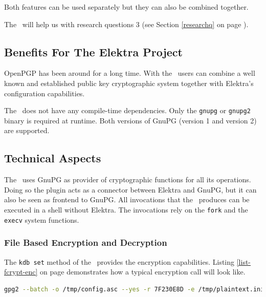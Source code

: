 Both features can be used separately but they can also be combined together.

The \fcrypt ~will help us with research questions 3 (see Section \ref{researchq} on page \pageref{researchq}).

\subsection{Benefits For The Elektra Project}

OpenPGP has been around for a long time.
With the \fcrypt ~users can combine a well known and established public key cryptographic system together with Elektra's configuration capabilities.

The \fcrypt ~does not have any compile-time dependencies.
Only the \texttt{gnupg} or \texttt{gnupg2} binary is required at runtime.
Both versions of GnuPG (version 1 and version 2) are supported.

%

\subsection{Technical Aspects}

The \fcrypt ~uses GnuPG as provider of cryptographic functions for all its operations.
Doing so the plugin acts as a connector between Elektra and GnuPG, but it can also be seen as frontend to GnuPG.
All invocations that the \fcrypt ~produces can be executed in a shell without Elektra.
The invocations rely on the \texttt{fork} and the \texttt{execv} system functions.

\subsubsection{File Based Encryption and Decryption}

The \texttt{kdb set} method of the \fcrypt ~provides the encryption capabilities.
Listing \ref{list-fcrypt-enc} on page \pageref{list-fcrypt-enc} demonstrates how a typical encryption call will look like.

\begin{lstlisting}[label=list-fcrypt-enc,language=Bash,caption={Fcrypt: encryption command}]
gpg2 --batch -o /tmp/config.asc --yes -r 7F230E8D -e /tmp/plaintext.ini
\end{lstlisting}

